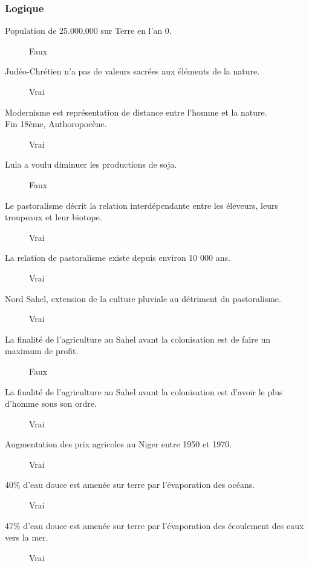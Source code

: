 \subsubsection{Logique}
\begin{description}
	\item [Population de 25.000.000 sur Terre en l'an 0. ]
	\color{cyan}Faux\color{black}

	\item [Judéo-Chrétien n'a pas de valeurs sacrées aux éléments de la nature. ]
	\color{cyan}Vrai\color{black}

	\item [Modernisme est représentation de distance entre l'homme et la nature. ]
	\color{cyan}\color{black}

	\item [Fin 18ème, Anthoropocène. ]
	\color{cyan}Vrai\color{black}

	\item [Lula a voulu diminuer les productions de soja. ]
	\color{cyan}Faux\color{black}
	
	\item [Le pastoralisme décrit la relation interdépendante entre les éleveurs, leurs troupeaux et leur biotope. ]
	\color{cyan}Vrai\color{black}
	
	\item [La relation de pastoralisme existe depuis environ 10 000 ans. ]
	\color{cyan}Vrai\color{black}

	\item [Nord Sahel, extension de la culture pluviale au détriment du pastoralisme. ]
	\color{cyan}Vrai\color{black}

	\item [La finalité de l'agriculture au Sahel avant la colonisation est de faire un maximum de profit. ]
	\color{cyan}Faux\color{black}
	
	\item [La finalité de l'agriculture au Sahel avant la colonisation est d'avoir le plus d'homme sous son ordre. ]
	\color{cyan}Vrai\color{black}

	\item [Augmentation des prix agricoles au Niger entre 1950 et 1970. ]
	\color{cyan}Vrai\color{black}

	\item [40\% d'eau douce est amenée sur terre par l'évaporation des océans. ]
	\color{cyan}Vrai\color{black}
	
	\item [47\% d'eau douce est amenée sur terre par l'évaporation des écoulement des eaux vers la mer. ]
	\color{cyan}Vrai\color{black}
	

\end{description}
